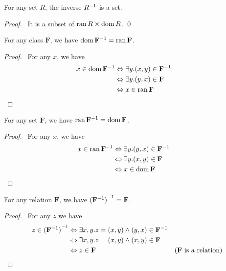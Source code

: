 \begin{theorem}
    For any set $R$, the inverse ${R}^{-1}$ is a set.
\end{theorem}

\begin{proof}
    \pf\ It is a subset of $\operatorname{ran} R \times \operatorname{dom} R$. \qed
\end{proof}

\begin{theorem}[Pairing]
    \label{theorem:dom_inv}
    For any class $\mathbf{F}$, we have $\operatorname{dom} {\mathbf{F}}^{-1} = \operatorname{ran} \mathbf{F}$.
\end{theorem}

\begin{proof}
    \pf\ For any $x$, we have
    \begin{align*}
        x \in \operatorname{dom} {\mathbf{F}}^{-1} & \Leftrightarrow \exists y. (x,y) \in {\mathbf{F}}^{-1} \\
        & \Leftrightarrow \exists y. (y,x) \in \mathbf{F} \\
        & \Leftrightarrow x \in \operatorname{ran} \mathbf{F} & \relax
    \end{align*}
\end{proof}

\begin{theorem}[Pairing]
    \label{theorem:ran_inv}
    For any set $\mathbf{F}$, we have $\operatorname{ran} {\mathbf{F}}^{-1} = \operatorname{dom} \mathbf{F}$.
\end{theorem}

\begin{proof}
    \pf\ For any $x$, we have
    \begin{align*}
        x \in \operatorname{ran} {\mathbf{F}}^{-1} & \Leftrightarrow \exists y. (y,x) \in {\mathbf{F}}^{-1} \\
        & \Leftrightarrow \exists y. (x,y) \in \mathbf{F} \\
        & \Leftrightarrow x \in \operatorname{dom} \mathbf{F} & \relax
    \end{align*}
\end{proof}

\begin{theorem}[Pairing]
    \label{theorem:inv_inv}
    For any relation $\mathbf{F}$, we have ${({\mathbf{F}}^{-1})}^{-1} = \mathbf{F}$.
\end{theorem}

\begin{proof}
    \pf\ For any $z$ we have
    \begin{align*}
        z \in {(\ensuremath{{\mathbf{F}}^{-1}})}^{-1} & \Leftrightarrow \exists x, y. z = (x,y) \wedge (y,x) \in {\mathbf{F}}^{-1} \\
        & \Leftrightarrow \exists x,y. z = (x,y) \wedge (x,y) \in \mathbf{F} \\
        & \Leftrightarrow z \in \mathbf{F} & (\text{$\mathbf{F}$ is a relation}) \relax
    \end{align*}
\end{proof}


